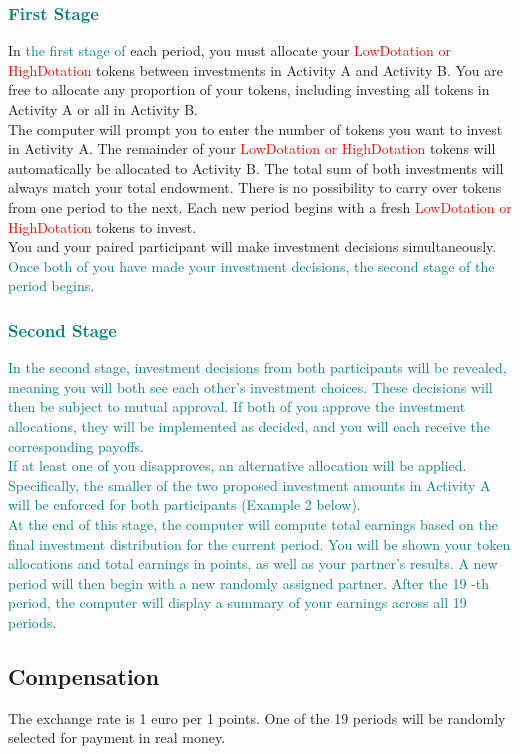 \documentclass[12pt]{article}
\newcommand{\periods}{19 }
\newcommand{\convertECU}{1 }
\newcommand{\dotationLow}{LowDotation }
\newcommand{\dotationHigh}{HighDotation }
\begin{document}
\subsubsection*{\textcolor{teal}{First Stage}}

\noindent In \textcolor{teal}{the first stage of} each period, you must allocate your \textcolor{red}{\dotationLow or \dotationHigh} tokens between investments in Activity A and Activity B. You are free to allocate any proportion of your tokens, including investing all tokens in Activity A or all in Activity B.\\

\noindent The computer will prompt you to enter the number of tokens you want to invest in Activity A. The remainder of your \textcolor{red}{\dotationLow or \dotationHigh} tokens will automatically be allocated to Activity B. The total sum of both investments will always match your total endowment. There is no possibility to carry over tokens from one period to the next. Each new period begins with a fresh \textcolor{red}{\dotationLow or \dotationHigh} tokens to invest.\\

\noindent You and your paired participant will make investment decisions simultaneously. \textcolor{teal}{Once both of you have made your investment decisions, the second stage of the period begins.}

\subsubsection*{\textcolor{teal}{Second Stage}}

\noindent \textcolor{teal}{In the second stage, investment decisions from both participants will be revealed, meaning you will both see each other’s investment choices. These decisions will then be subject to mutual approval. If both of you approve the investment allocations, they will be implemented as decided, and you will each receive the corresponding payoffs.}\\

\noindent \textcolor{teal}{If at least one of you disapproves, an alternative allocation will be applied. Specifically, the smaller of the two proposed investment amounts in Activity A will be enforced for both participants (Example 2 below).}\\

\noindent \textcolor{teal}{At the end of this stage, the computer will compute total earnings based on the final investment distribution for the current period. You will be shown your token allocations and total earnings in points, as well as your partner's results. A new period will then begin with a new randomly assigned partner. After the \periods-th period, the computer will display a summary of your earnings across all \periods periods.}



\subsection*{Compensation}

\noindent The exchange rate is 1 euro per \convertECU points. One of the \periods periods will be randomly selected for payment in real money.
\end{document}
